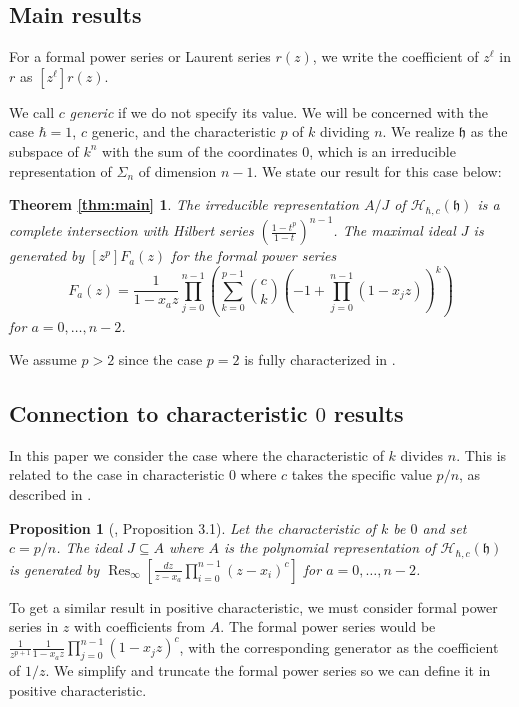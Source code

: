 \documentclass{article}
\numberwithin{equation}{section}
\newtheorem{proposition}[equation]{Proposition}
\newcommand{\Res}{\operatorname{Res}}
\newcommand{\h}{\mathfrak{h}}
\newcommand{\HH}{\mathcal{H}}
\begin{document}
\subsection{Main results}

For a formal power series or Laurent series $r(z)$, we write the coefficient of $z^\ell$ in $r$ as $[z^\ell]r(z)$. 

 We call $c$ {\it generic} if we do not specify its value. We will be concerned with the case $\hbar=1$, $c$ generic, and the characteristic $p$ of $k$ dividing $n$. We realize $\h$ as the subspace of $k^n$ with the sum of the coordinates $0$, which is an irreducible representation of $\Sigma_n$ of dimension $n-1$. We state our result for this case below:
 
 \newtheorem*{thm:main}{Theorem \ref{thm:main}}
\begin{thm:main} The irreducible representation $A/J$  of $\HH_{\hbar,c}(\h)$ is a complete intersection with  Hilbert series $\left(\frac{1-t^p}{1-t}\right)^{n-1}$. The maximal ideal $J$ is generated by $[z^p]F_a(z)$ for the formal power series $$F_a(z)=\frac{1}{1-x_az} \prod_{j=0}^{n-1}\left( \sum_{k=0}^{p-1} \binom{c}{k}(-1+\prod_{j=0}^{n-1} (1-x_jz))^k\right)$$ for $a=0,\dots,n-2$. 
\end{thm:main}

We assume $p>2$ since the case $p=2$ is fully characterized in \cite{L}.

\subsection{Connection to characteristic $0$ results}

In this paper we consider the case where the characteristic of $k$ divides $n$. This is related to the case in characteristic $0$ where $c$ takes the specific value $p/n$, as described in \cite{CE}. 

\begin{proposition}[\cite{CE}, Proposition 3.1] Let the characteristic of $k$ be $0$ and set $c=p/n$. The ideal $J \subseteq A$ where $A$ is the polynomial representation of $\HH_{\hbar,c}(\h)$ is generated by $\Res_\infty\left[\frac{dz}{z-x_a} \prod_{i=0}^{n-1} (z-x_i)^c\right]$ for $a=0,\dots,n-2$.
\end{proposition}


To get a similar result in positive characteristic, we must consider formal power series in $z$ with coefficients from $A$. The formal power series would be $\frac{1}{z^{p+1}}\frac{1}{1-x_az}\prod_{j=0}^{n-1} (1-x_jz)^c$, with the corresponding generator as the coefficient of $1/z$. We simplify and truncate the formal power series so we can define it in positive characteristic.
\end{document}
